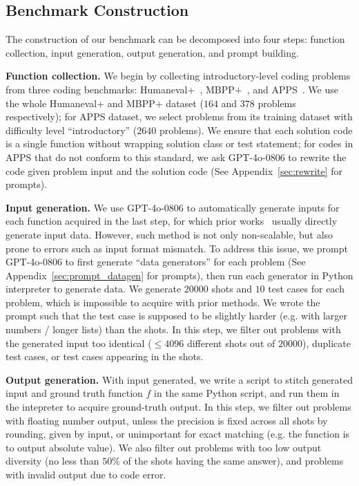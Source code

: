 \subsection{Benchmark Construction}
\label{sec:construction}

The construction of our benchmark can be decomposed into four steps: function collection, input generation, output generation, and prompt building.

\textbf{Function collection.} We begin by collecting introductory-level coding problems from three coding benchmarks: Humaneval+~\citep{evalplus}, MBPP+~\citep{evalplus}, and APPS~\citep{hendrycks2021measuring}. We use the whole Humaneval+ and MBPP+ dataset ($164$ and $378$ problems respectively); for APPS dataset, we select problems from its training dataset with difficulty level ``introductory'' ($2640$ problems). We ensure that each solution code is a single function without wrapping solution class or test statement; for codes in APPS that do not conform to this standard, we ask GPT-4o-0806 to rewrite the code given problem input and the solution code (See Appendix~\ref{sec:rewrite} for prompts). 


\textbf{Input generation.} We use GPT-4o-0806 to automatically generate inputs for each function acquired in the last step, for which prior works~\citep{shao2024case2code, li2024programming} usually directly generate input data. However, such method is not only non-scalable, but also prone to errors such as input format mismatch. To address this issue, we prompt GPT-4o-0806 to first generate ``data generators'' for each problem (See Appendix~\ref{sec:prompt_datagen} for prompts), then run each generator in Python interpreter to generate data. We generate $20000$ shots and $10$ test cases for each problem, which is impossible to acquire with prior methods. We wrote the prompt such that the test case is supposed to be slightly harder (e.g. with larger numbers / longer lists) than the shots. In this step, we filter out problems with the generated input too identical ($\leq 4096$ different shots out of $20000$), duplicate test cases, or test cases appearing in the shots.

\textbf{Output generation.} With input generated, we write a script to stitch generated input and ground truth function $f$ in the same Python script, and run them in the intepreter to acquire ground-truth output. In this step, we filter out problems with floating number output, unless the precision is fixed across all shots by rounding, given by input, or unimportant for exact matching (e.g. the function is to output absolute value). We also filter out problems with too low output diversity (no less than $50\%$ of the shots having the same answer), and problems with invalid output due to code error.

